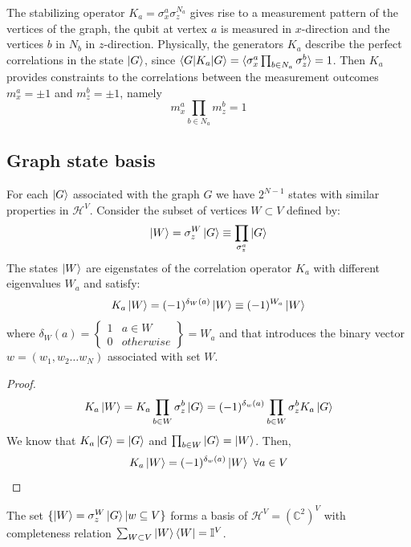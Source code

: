 \documentclass[10pt,a4paper]{book}
\numberwithin{equation}{chapter}
\numberwithin{figure}{chapter}
\numberwithin{table}{chapter}
\begin{document}
The stabilizing operator $K_a=\sigma^{a}_{x}\sigma^{N_a}_{z}$ gives rise to a measurement pattern of the vertices of the graph, the qubit at vertex $a$ is measured in $x$-direction and the vertices $b$ in $N_b$ in $z$-direction.
Physically, the generators $K_a$ describe the perfect correlations in the state $\ket{G}$, since $\braket{G|K_a|G}=\braket{\sigma^{a}_{x}\prod_{b\in N_a}\sigma^{b}_{z}}=1$. Then $K_a$ provides constraints to the correlations between the measurement outcomes $m^{a}_{x} = \pm 1$ and $m^{b}_{z} = \pm 1$, namely
\begin{equation}
m^{a}_{x} \prod_{b \in N_a}m^{b}_{z}=1
\end{equation}

\subsection{Graph state basis}
For each $\ket{G}$ associated with the graph $G$ we have $2^{N-1}$ states with similar properties in $\mathcal{H}^{V}$. Consider the subset of vertices $W \subset V$ defined by:
\begin{equation}
\ket{W}=\sigma^{W}_{z}\ket{G}\equiv \prod_{\sigma^{a}_{z}}\ket{G}
\end{equation}
The states $\ket{W}$ are eigenstates of the correlation operator $K_a$ with different eigenvalues $W_a$ and satisfy:
\begin{equation}
K_{a}\ket{W}=(-1)^{\delta_{W}(a)}\ket{W}\equiv (-1)^{W_a}\ket{W}
\end{equation}
where $\delta_{W}(a)=\left\lbrace \begin{array}{cc} 1 & a \in W \\ 0 & otherwise \end{array}\right\rbrace=W_a$ and that introduces the binary vector $w=(w_{1},w_{2}\ldots w_{N})$ associated with set $W$.

\begin{proof}
$$K_{a}\ket{W}=K_{a}\prod_{b\in W} \sigma^{b}_{z}\ket{G}=(-1)^{\delta_{w}(a)}\prod_{b\in W} \sigma^{b}_{z}K_{a}\ket{G}$$
We know that $K_{a}\ket{G}=\ket{G}$ and $\prod_{b\in W}\ket{G}=\ket{W}$. Then,
\begin{equation}
K_{a}\ket{W}= (-1)^{\delta_{w}(a)} \ket{W} \ \forall a \in V 
\end{equation}
\end{proof}

The set $\lbrace \ket{W}=\sigma^{W}_{z}\ket{G} | w\subseteq V\rbrace$ forms a basis of $\mathcal{H}^{V}=(\mathbb{C}^2)^V$ with completeness relation $\sum_{W \subset V}\ket{W}\bra{W}=\mathbb{I}^{V}$.
\end{document}
